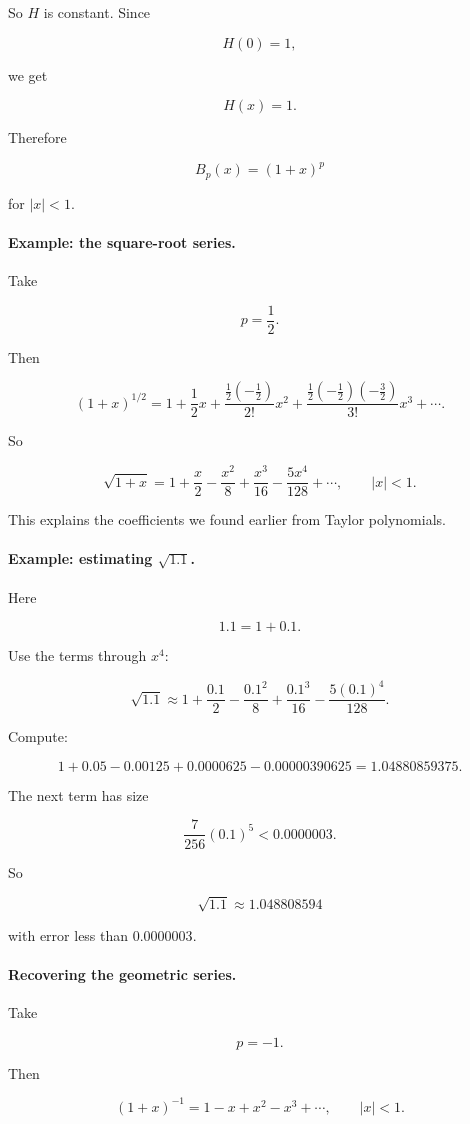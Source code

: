 So \(H\) is constant.  Since

\[
H(0)=1,
\]

we get

\[
H(x)=1.
\]

Therefore

\[
B_p(x)=(1+x)^p
\]

for \(|x|<1\).

\paragraph{Example: the square-root series.}
Take

\[
p=\frac12.
\]

Then

\[
(1+x)^{1/2}
=
1+\frac12x+\frac{\frac12(-\frac12)}{2!}x^2
+\frac{\frac12(-\frac12)(-\frac32)}{3!}x^3+\cdots.
\]

So

\[
\boxed{
\sqrt{1+x}
=
1+\frac{x}{2}-\frac{x^2}{8}+\frac{x^3}{16}
-\frac{5x^4}{128}+\cdots,
\qquad |x|<1.
}
\]

This explains the coefficients we found earlier from Taylor polynomials.

\paragraph{Example: estimating \(\sqrt{1.1}\).}
Here

\[
1.1=1+0.1.
\]

Use the terms through \(x^4\):

\[
\sqrt{1.1}
\approx
1+\frac{0.1}{2}-\frac{0.1^2}{8}
+\frac{0.1^3}{16}
-\frac{5(0.1)^4}{128}.
\]

Compute:

\[
1+0.05-0.00125+0.0000625-0.00000390625
=
1.04880859375.
\]

The next term has size

\[
\frac{7}{256}(0.1)^5<0.0000003.
\]

So

\[
\boxed{
\sqrt{1.1}\approx1.048808594
}
\]

with error less than \(0.0000003\).

\paragraph{Recovering the geometric series.}
Take

\[
p=-1.
\]

Then

\[
(1+x)^{-1}
=
1-x+x^2-x^3+\cdots,
\qquad |x|<1.
\]

